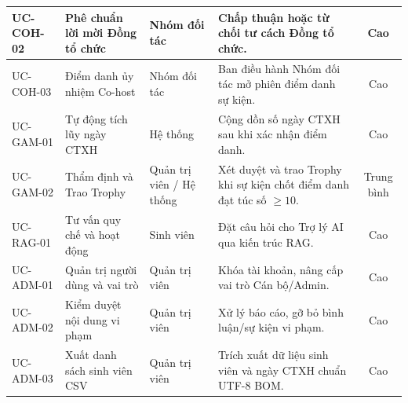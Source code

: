 \begin{xltabular}{\textwidth}{|l|p{4.2cm}|l|X|c|}
UC-COH-02 & Phê chuẩn lời mời Đồng tổ chức & Nhóm đối tác & Chấp thuận hoặc từ chối tư cách Đồng tổ chức. & Cao \\ \hline
UC-COH-03 & Điểm danh ủy nhiệm Co-host & Nhóm đối tác & Ban điều hành Nhóm đối tác mở phiên điểm danh sự kiện. & Cao \\ \hline
UC-GAM-01 & Tự động tích lũy ngày CTXH & Hệ thống & Cộng dồn số ngày CTXH sau khi xác nhận điểm danh. & Cao \\ \hline
UC-GAM-02 & Thẩm định và Trao Trophy & Quản trị viên / Hệ thống & Xét duyệt và trao Trophy khi sự kiện chốt điểm danh đạt túc số $\ge 10$. & Trung bình \\ \hline
UC-RAG-01 & Tư vấn quy chế và hoạt động & Sinh viên & Đặt câu hỏi cho Trợ lý AI qua kiến trúc RAG. & Cao \\ \hline
UC-ADM-01 & Quản trị người dùng và vai trò & Quản trị viên & Khóa tài khoản, nâng cấp vai trò Cán bộ/Admin. & Cao \\ \hline
UC-ADM-02 & Kiểm duyệt nội dung vi phạm & Quản trị viên & Xử lý báo cáo, gỡ bỏ bình luận/sự kiện vi phạm. & Cao \\ \hline
UC-ADM-03 & Xuất danh sách sinh viên CSV & Quản trị viên & Trích xuất dữ liệu sinh viên và ngày CTXH chuẩn UTF-8 BOM. & Cao \\ \hline
\end{xltabular}
\endgroup
